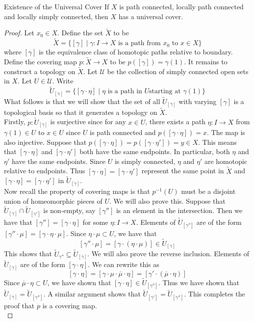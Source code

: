 \documentclass[a4paper]{article}
\begin{document}
\begin{thm}{Existence of the Universal Cover}{} If $X$ is path connected, locally path connected and locally simply connected, then $X$ has a universal cover. 
\begin{proof}
Let $x_0\in X$. Define the set $\widetilde{X}$ to be $$\widetilde{X}=\{[\gamma]\;|\;\gamma:I\to X\text{ is a path from }x_0\text{ to }x\in X\}$$ where $[\gamma]$ is the equivalence class of homotopic paths relative to boundary. Define the covering map $p:\widetilde{X}\to X$ to be $p([\gamma])=\gamma(1)$. It remains to construct a topology on $\widetilde{X}$. Let $\mathcal{U}$ be the collection of simply connected open sets in $X$. Let $U\in\mathcal{U}$. Write $$\widetilde{U}_{[\gamma]}=\{[\gamma\cdot\eta]\;|\;\eta\text{ is a path in }U\text{starting at }\gamma(1)\}$$ What follows is that we will show that the set of all $\widetilde{U}_{[\gamma]}$ with varying $[\gamma]$ is a topological basis so that it generates a topology on $\widetilde{X}$. \\

Firstly, $p:\widetilde{U}_{[\gamma]}$ is surjective since for any $x\in U$, there exists a path $\eta:I\to X$ from $\gamma(1)\in U$ to $x\in U$ since $U$ is path connected and $p([\gamma\cdot\eta])=x$. The map is also injective. Suppose that $p([\gamma\cdot\eta])=p([\gamma\cdot\eta'])=y\in X$. This means that $[\gamma\cdot\eta]$ and $[\gamma\cdot\eta']$ both have the same endpoints. In particular, both $\eta$ and $\eta'$ have the same endpoints. Since $U$ is simply connected, $\eta$ and $\eta'$ are homotopic relative to endpoints. Thus $[\gamma\cdot\eta]=[\gamma\cdot\eta']$ represent the same point in $\widetilde{X}$ and $[\gamma\cdot\eta]=[\gamma\cdot\eta']$ in $\widetilde{U}_{[\gamma]}$. \\

Now recall the property of covering maps is that $p^{-1}(U)$ must be a disjoint union of homeomorphic pieces of $U$. We will also prove this. Suppose that $\widetilde{U}_{[\gamma]}\cap\widetilde{U}_{[\gamma']}$ is non-empty, say $[\gamma'']$ is an element in the intersection. Then we have that $[\gamma'']=[\gamma\cdot\eta]$ for some $\eta:I\to X$. Elements of $\widetilde{U}_{[\gamma'']}$ are of the form $[\gamma''\cdot\mu]=[\gamma\cdot\eta\cdot\mu]$. Since $\eta\cdot\mu\subset U$, we have that $$[\gamma''\cdot\mu]=[\gamma\cdot(\eta\cdot\mu)]\in\widetilde{U}_{[\gamma]}$$ This shows that $\widetilde{U}_{\gamma''}\subseteq\widetilde{U}_{[\gamma]}$. We will also prove the reverse inclusion. Elements of $\widetilde{U}_{[\gamma]}$ are of the form $[\gamma\cdot\eta]$. We can rewrite this as $$[\gamma\cdot\eta]=[\gamma\cdot\mu\cdot\overline{\mu}\cdot\eta]=[\gamma'\cdot(\overline{\mu}\cdot\eta)]$$ Since $\overline{\mu}\cdot\eta\subset U$, we have shown that $[\gamma\cdot\eta]\in\widetilde{U}_{[\gamma'']}$. Thus we have shown that $\widetilde{U}_{[\gamma]}=\widetilde{U}_{[\gamma'']}$. A similar argument shows that $\widetilde{U}_{[\gamma']}=\widetilde{U}_{[\gamma'']}$. This completes the proof that $p$ is a covering map. \\


\end{proof}
\end{thm}
\end{document}
